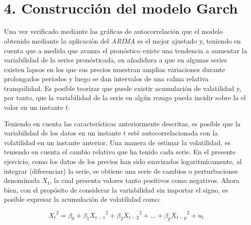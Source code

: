 \documentclass[11pt]{article}
\begin{document}
    \begin{center}
    \end{center}
    { \hspace*{\fill} \\}
    
    \begin{center}
    \end{center}
    { \hspace*{\fill} \\}
    
    \hypertarget{construcciuxf3n-del-modelo-garch}{%
\section{ 4. Construcción del modelo
Garch}\label{construcciuxf3n-del-modelo-garch}}

    Una vez verificado mediante las gráficas de autocorrelación que el
modelo obtenido mediante la aplicación del \emph{ARIMA} es el mejor
ajustado y, teniendo en cuenta que a medida que avanza el pronóstico
existe una tendencia a aumentar la variabilidad de la series
pronósticada, en añadidura a que en algunas series existen lapsos en los
que sus precios muestran amplias variaciones durante prolongados
periodos y luego se dan intervalos de una calma relativa tranquilidad.
Es posible teorizar que puede existir acumulación de valatilidad y, por
tanto, que la variabilidad de la serie en algún rezago pueda incidir
sobre la el valor en un instante \(t\).

Teniendo en cuenta las características anteriormente descritas, es
posible que la variabilidad de los datos en un instante \(t\) esté
autocorrelacionada con la volatilidad en un instante anterior. Una
manera de estimar la volatilidad, es teniendo en cuenta el cambio
relativo que ha tenido cada serie. En el presente ejercicio, como los
datos de los precios han sido suavizados logaritmicamente, al integrar
(diferenciar) la serie, se obtiene una serie de cambios o perturbaciones
denominada \(X_t\), la cual presenta valores tanto positivos como
negativos. Ahora bien, con el propósito de considerar la variabilidad
sin importar el signo, es posible expresar la acumulación de volatilidad
como:

\begin{equation*}
{X_t}^2 =  β_0 + β_1{X_{t-1}}^2+β_2{X_{t-2}}^2+...+β_p{X_{t-p}}^2+u_t
\end{equation*}
\end{document}
